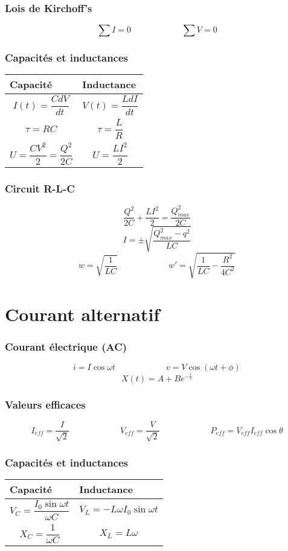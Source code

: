 \section{Lois de Kirchoff's}
\[\sum{I} = 0  \qquad{\qquad{\qquad}}\sum{V} = 0\]

\section{Capacités et inductances}

\begin{table}[H]
	\begin{center}
		\begin{tabular}{m{6.5cm}|m{6.5cm}}
			\textbf{Capacité} & \textbf{Inductance}\\
			\hline
			\[I(t) = \frac {CdV}{dt}\] & \[V(t) = \frac{LdI}{dt}\]\\
			\[\tau = RC\] & \[\tau = \frac{L}{R}\]\\
			\[U = \frac{CV^2}{2} = \frac{Q^2}{2C}\] & \[U = \frac{LI^2}{2}\]
		\end{tabular}
	\end{center}
\end{table}

\section{Circuit R-L-C}
\[ \frac{Q^2}{2C} + \frac{LI^2}{2} = \frac{Q^{2}_{max}}{2C} \]
\[ I = \pm \sqrt{\frac{Q^{2}_{max} - q^2}{LC}} \]
\[ w = \sqrt{\frac{1}{LC}}\qquad{\qquad{\qquad}}w' = \sqrt{\frac{1}{LC} - \frac{R^2}{4C^{2}}} \]
\part{Courant alternatif}
\section{Courant électrique (AC)}
\[i = I\cos{\omega{t}}\qquad{\qquad{\qquad}}v = V\cos{(\omega{t} + \phi)}\]
\[X(t) = A + Be^{-\frac{t}{\tau}}\]
\section{Valeurs efficaces}
\[I_{eff} = \frac{I}{\sqrt{2}}\qquad{\qquad{\qquad}}V_{eff} = \frac{V}{\sqrt{2}}\qquad{\qquad{\qquad}}P_{eff} = V_{eff}I_{eff}\cos{\theta}\]
\section{Capacités et inductances}
\begin{table}[H]
	\begin{center}
		\begin{tabular}{m{6.5cm}|m{6.5cm}}
			\textbf{Capacité} & \textbf{Inductance}\\
			\hline
			\[V_C = \frac{I_{0}\sin{\omega{t}}}{\omega{C}}\]&\[V_{L} = -L\omega{}I_{0}\sin{\omega{t}}\]\\
			\[X_C = \frac{1}{\omega{C}}\]&\[X_L = L\omega\]
		\end{tabular}
	\end{center}
\end{table}

